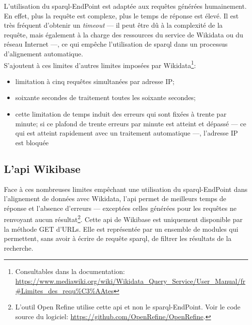 L'utilisation du \ac{sparql}-EndPoint est adaptée aux requêtes générées humainement. En effet, plus la requête est complexe, plus le temps de réponse est élevé. Il est très fréquent d'obtenir un \textit{timeout} --- il peut être dû à la complexité de la requête, mais également à la charge des ressources du service de Wikidata ou du réseau Internet ---, ce qui empêche l'utilisation de \ac{sparql} dans un processus d'alignement automatique.\\

S'ajoutent à ces limites d'autres limites imposées par Wikidata\footnote{Consultables dans la documentation: \url{https://www.mediawiki.org/wiki/Wikidata_Query_Service/User_Manual/fr\#Limites_des_requ\%C3\%AAtes}}:
\begin{itemize}
	\item limitation à cinq requêtes simultanées par adresse IP;
	\item soixante secondes de traitement toutes les soixante secondes;
	\item cette limitation de temps induit des erreurs qui sont fixées à trente par minute; si ce plafond de trente erreurs par minute est atteint et dépassé --- ce qui est atteint rapidement avec un traitement automatique ---, l'adresse IP est bloquée
\end{itemize}

\subsection{\label{II-C-1-c}L'\ac{api} Wikibase}

Face à ces nombreuses limites empêchant une utilisation du \ac{sparql}-EndPoint dans l'alignement de données avec Wikidata, l'\ac{api} permet de meilleurs temps de réponse et l'absence d'erreurs --- exceptées celles générées pour les requêtes ne renvoyant aucun résultat\footnote{L'outil Open Refine utilise cette \ac{api} et non le \ac{sparql}-EndPoint. Voir le code source du logiciel: \url{https://github.com/OpenRefine/OpenRefine}.}. Cette \ac{api} de Wikibase est uniquement disponible par la méthode GET d'URLs. Elle est représentée par un ensemble de modules qui permettent, sans avoir à écrire de requête \ac{sparql}, de filtrer les résultats de la recherche.\\

